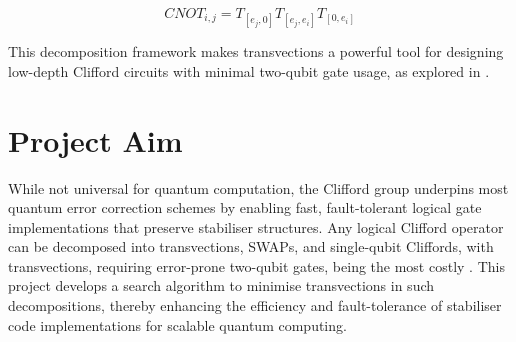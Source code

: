 \begin{equation}
    CNOT_{i,j}=T_{[e_j,0]}T_{[e_j,e_i]}T_{[0,e_i]}
\end{equation}

This decomposition framework makes transvections a powerful tool for designing low-depth Clifford circuits with minimal two-qubit gate usage, as explored in \cite{volanto2023minimizing}.


\section{Project Aim}
While not universal for quantum computation, the Clifford group underpins most quantum error correction schemes by enabling fast, fault-tolerant logical gate implementations that preserve stabiliser structures. Any logical Clifford operator can be decomposed into transvections, SWAPs, and single-qubit Cliffords, with transvections, requiring error-prone two-qubit gates, being the most costly \cite{volanto2023minimizing}. This project develops a search algorithm to minimise transvections in such decompositions, thereby enhancing the efficiency and fault-tolerance of stabiliser code implementations for scalable quantum computing.